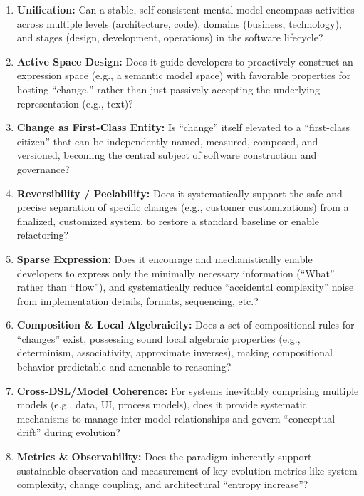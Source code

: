 \documentclass[11pt]{article}
\begin{document}
\begin{enumerate}
    \item \textbf{Unification:} Can a stable, self-consistent mental model encompass activities across multiple levels (architecture, code), domains (business, technology), and stages (design, development, operations) in the software lifecycle?
    
    \item \textbf{Active Space Design:} Does it guide developers to proactively construct an expression space (e.g., a semantic model space) with favorable properties for hosting ``change,'' rather than just passively accepting the underlying representation (e.g., text)?
    
    \item \textbf{Change as First-Class Entity:} Is ``change'' itself elevated to a ``first-class citizen'' that can be independently named, measured, composed, and versioned, becoming the central subject of software construction and governance?
    
    \item \textbf{Reversibility / Peelability:} Does it systematically support the safe and precise separation of specific changes (e.g., customer customizations) from a finalized, customized system, to restore a standard baseline or enable refactoring?
    
    \item \textbf{Sparse Expression:} Does it encourage and mechanistically enable developers to express only the minimally necessary information (``What'' rather than ``How''), and systematically reduce ``accidental complexity'' noise from implementation details, formats, sequencing, etc.?
    
    \item \textbf{Composition \& Local Algebraicity:} Does a set of compositional rules for ``changes'' exist, possessing sound local algebraic properties (e.g., determinism, associativity, approximate inverses), making compositional behavior predictable and amenable to reasoning?
    
    \item \textbf{Cross-DSL/Model Coherence:} For systems inevitably comprising multiple models (e.g., data, UI, process models), does it provide systematic mechanisms to manage inter-model relationships and govern ``conceptual drift'' during evolution?
    
    \item \textbf{Metrics \& Observability:} Does the paradigm inherently support sustainable observation and measurement of key evolution metrics like system complexity, change coupling, and architectural ``entropy increase''?
    

\end{enumerate}
\end{document}

